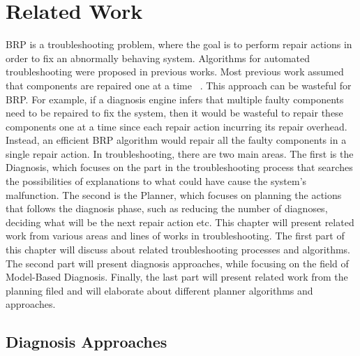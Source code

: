 \documentclass[a4paper,11pt]{report}
\newcommand{\citep}{\cite}
\begin{document}
\chapter{Related Work}
\label{sec:relatedWork}	
BRP is a troubleshooting problem, where the goal is to perform repair actions in order to fix an abnormally behaving system. Algorithms for automated troubleshooting were proposed in previous works. Most previous work assumed that components are repaired one at a time ~\citep{heckerman1995decision,friedrich1992choosing,Nyberg12,Torta14}. This approach can be wasteful for BRP. For example, if a diagnosis engine infers that multiple faulty components need to be repaired to fix the system, then it would be wasteful to repair these components one at a time since each repair action incurring its repair overhead. Instead, an efficient BRP algorithm would repair all the faulty components in a single repair action. 
In troubleshooting, there are two main areas. The first is the Diagnosis, which focuses on the part in the troubleshooting process that searches the possibilities of explanations to what could have cause the system's malfunction. The second is the Planner, which focuses on planning the actions that follows the diagnosis phase, such as reducing the number of diagnoses, deciding what will be the next repair action etc. This chapter will present related work from various areas and lines of works in troubleshooting. The first part of this chapter will discuss about related troubleshooting processes and algorithms. The second part will present diagnosis approaches, while focusing on the field of Model-Based Diagnosis. Finally, the last part will present related work from the planning filed and will elaborate about different planner algorithms and approaches. 

\section{Diagnosis Approaches}
\end{document}
